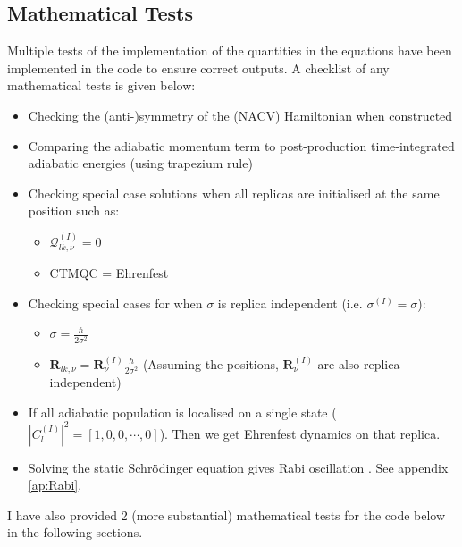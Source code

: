 \subsection{Mathematical Tests}
Multiple tests of the implementation of the quantities in the equations have been implemented in the code to ensure correct outputs. A checklist of any mathematical tests is given below:
\begin{itemize}
  \item Checking the (anti-)symmetry of the (NACV) Hamiltonian when constructed
  
  \item Comparing the adiabatic momentum term to post-production time-integrated adiabatic energies (using trapezium rule)
  
  \item Checking special case solutions when all replicas are initialised at the same position such as:
	\begin{itemize}
	  \item $\mathcal{Q}_{lk, \nu}^{(I)} = 0$
	  \item CTMQC = Ehrenfest
	\end{itemize}

  \item Checking special cases for when $\sigma$ is replica independent (i.e. $\sigma^{(I)} = \sigma$):
	\begin{itemize}
	  \item $\sigma = \frac{\hbar}{2 \sigma^2}$
	  \item $\mathbf{R}_{lk, \nu} = \mathbf{R}_{\nu}^{(I)} \frac{\hbar}{2 \sigma^2}$ (Assuming the positions, $\mathbf{R}_{\nu}^{(I)}$ are also replica independent)
	\end{itemize}

  \item If all adiabatic population is localised on a single state ($|C_{l}^{(I)}|^2 = [1, 0, 0, \cdots, 0]$). Then we get Ehrenfest dynamics on that replica.
  \item Solving the static Schr\"odinger equation gives Rabi oscillation \cite{FeynmanLectVol3}. See appendix \ref{ap:Rabi}.
\end{itemize}

I have also provided 2 (more substantial) mathematical tests for the code below in the following sections.

